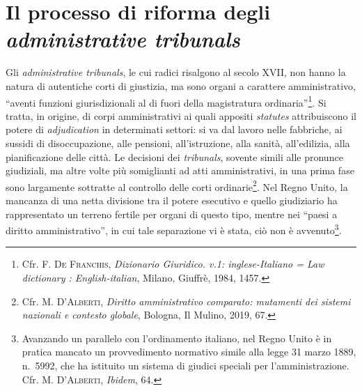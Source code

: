 \documentclass[12pt,it,a4paper,]{report}
\begin{document}
\hypertarget{il-processo-di-riforma-degli-administrative-tribunals}{%
\section{\texorpdfstring{Il processo di riforma degli
\emph{administrative
tribunals}}{Il processo di riforma degli administrative tribunals}}\label{il-processo-di-riforma-degli-administrative-tribunals}}

Gli \emph{administrative tribunals}, le cui radici risalgono al secolo
XVII, non hanno la natura di autentiche corti di giustizia, ma sono
organi a carattere amministrativo, ``aventi funzioni giurisdizionali al
di fuori della magistratura ordinaria''\footnote{Cfr. F. \textsc{De
  Franchis}, \emph{Dizionario Giuridico. v.1: inglese-Italiano = Law
  dictionary : English-italian}, Milano, Giuffrè, 1984, 1457.}. Si
tratta, in origine, di corpi amministrativi ai quali appositi
\emph{statutes} attribuiscono il potere di \emph{adjudication} in
determinati settori: si va dal lavoro nelle fabbriche, ai sussidi di
disoccupazione, alle pensioni, all'istruzione, alla sanità,
all'edilizia, alla pianificazione delle città. Le decisioni dei
\emph{tribunals}, sovente simili alle pronunce giudiziali, ma altre
volte più somiglianti ad atti amministrativi, in una prima fase sono
largamente sottratte al controllo delle corti ordinarie\footnote{Cfr. M.
  \textsc{D'Alberti}, \emph{Diritto amministrativo comparato: mutamenti
  dei sistemi nazionali e contesto globale}, Bologna, Il Mulino, 2019,
  67.}. Nel Regno Unito, la mancanza di una netta divisione tra il
potere esecutivo e quello giudiziario ha rappresentato un terreno
fertile per organi di questo tipo, mentre nei ``paesi a diritto
amministrativo'', in cui tale separazione vi è stata, ciò non è
avvenuto\footnote{Avanzando un parallelo con l'ordinamento italiano, nel
  Regno Unito è in pratica mancato un provvedimento normativo simile
  alla legge 31 marzo 1889, n.~5992, che ha istituito un sistema di
  giudici speciali per l'amministrazione. Cfr. M. \textsc{D'Alberti},
  \emph{Ibidem}, 64.}.
\end{document}
